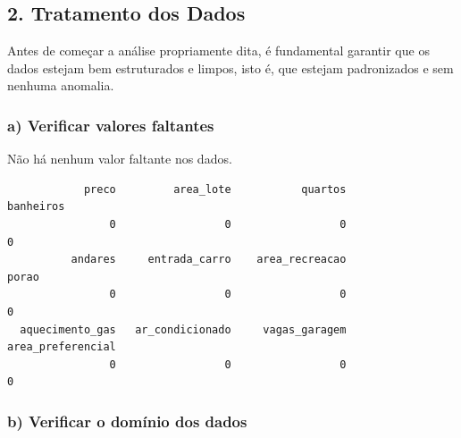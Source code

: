 \documentclass[
  letterpaper,
  DIV=11,
  numbers=noendperiod]{scrartcl}
\begin{document}
\subsection{2. Tratamento dos Dados}\label{tratamento-dos-dados}

Antes de começar a análise propriamente dita, é fundamental garantir que
os dados estejam bem estruturados e limpos, isto é, que estejam
padronizados e sem nenhuma anomalia.

\subsubsection{a) Verificar valores
faltantes}\label{a-verificar-valores-faltantes}

Não há nenhum valor faltante nos dados.

\begin{verbatim}
            preco         area_lote           quartos         banheiros 
                0                 0                 0                 0 
          andares     entrada_carro    area_recreacao             porao 
                0                 0                 0                 0 
  aquecimento_gas   ar_condicionado     vagas_garagem area_preferencial 
                0                 0                 0                 0 
\end{verbatim}

\subsubsection{b) Verificar o domínio dos
dados}\label{b-verificar-o-domuxednio-dos-dados}
\end{document}
